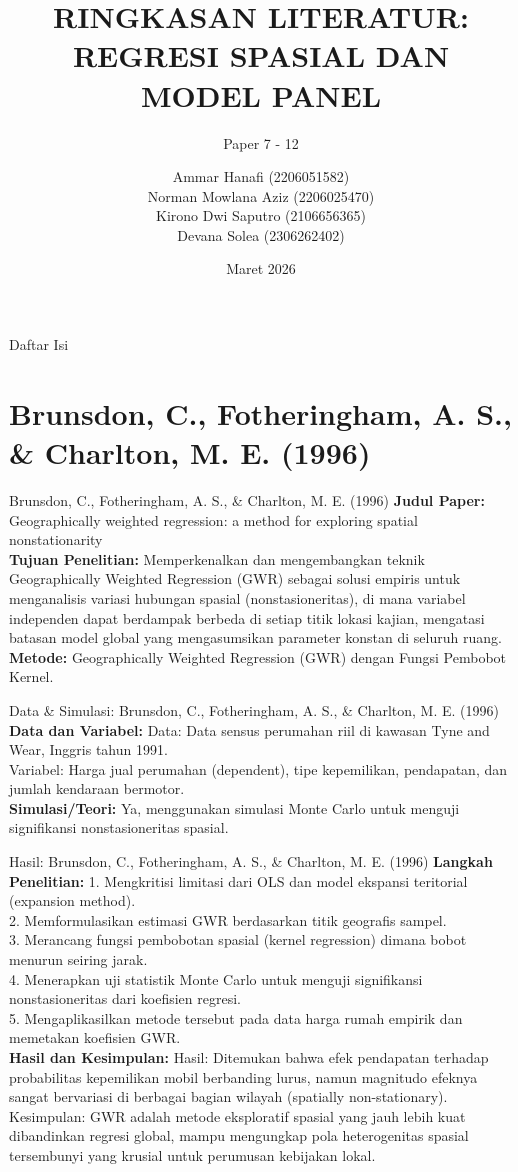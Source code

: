 \documentclass{beamer}
\title[Ringkasan Literatur Spasial 7-12]{RINGKASAN LITERATUR: REGRESI SPASIAL DAN MODEL PANEL}
\subtitle{Paper 7 - 12}
\author[Ammar, Norman, Kirono, Devana]{
    Ammar Hanafi (2206051582) \\ 
    Norman Mowlana Aziz (2206025470) \\ 
    Kirono Dwi Saputro (2106656365) \\ 
    Devana Solea (2306262402)
}
\institute[Univ. Indonesia]{
    Program Studi Sarjana Statistika \\
    Fakultas Matematika dan Ilmu Pengetahuan Alam \\
    Universitas Indonesia
}
\date{Maret 2026}
\begin{document}
\frame{\titlepage}

\begin{frame}[allowframebreaks]{Daftar Isi}
    \tableofcontents
\end{frame}
\section{Brunsdon, C., Fotheringham, A. S., \& Charlton, M. E. (1996)}
\begin{frame}[allowframebreaks]{Brunsdon, C., Fotheringham, A. S., \& Charlton, M. E. (1996)}
\textbf{Judul Paper:} Geographically weighted regression: a method for exploring spatial nonstationarity \\[0.3cm]
\textbf{Tujuan Penelitian:} Memperkenalkan dan mengembangkan teknik Geographically Weighted Regression (GWR) sebagai solusi empiris untuk menganalisis variasi hubungan spasial (nonstasioneritas), di mana variabel independen dapat berdampak berbeda di setiap titik lokasi kajian, mengatasi batasan model global yang mengasumsikan parameter konstan di seluruh ruang. \\[0.3cm]
\textbf{Metode:} Geographically Weighted Regression (GWR) dengan Fungsi Pembobot Kernel.
\end{frame}

\begin{frame}[allowframebreaks]{Data \& Simulasi: Brunsdon, C., Fotheringham, A. S., \& Charlton, M. E. (1996)}
\textbf{Data dan Variabel:} Data: Data sensus perumahan riil di kawasan Tyne and Wear, Inggris tahun 1991.\\ Variabel: Harga jual perumahan (dependent), tipe kepemilikan, pendapatan, dan jumlah kendaraan bermotor. \\[0.3cm]
\textbf{Simulasi/Teori:} Ya, menggunakan simulasi Monte Carlo untuk menguji signifikansi nonstasioneritas spasial.
\end{frame}

\begin{frame}[allowframebreaks]{Hasil: Brunsdon, C., Fotheringham, A. S., \& Charlton, M. E. (1996)}
\textbf{Langkah Penelitian:} 1. Mengkritisi limitasi dari OLS dan model ekspansi teritorial (expansion method).\\ 2. Memformulasikan estimasi GWR berdasarkan titik geografis sampel.\\ 3. Merancang fungsi pembobotan spasial (kernel regression) dimana bobot menurun seiring jarak.\\ 4. Menerapkan uji statistik Monte Carlo untuk menguji signifikansi nonstasioneritas dari koefisien regresi.\\ 5. Mengaplikasilkan metode tersebut pada data harga rumah empirik dan memetakan koefisien GWR. \\[0.3cm]
\textbf{Hasil dan Kesimpulan:} Hasil: Ditemukan bahwa efek pendapatan terhadap probabilitas kepemilikan mobil berbanding lurus, namun magnitudo efeknya sangat bervariasi di berbagai bagian wilayah (spatially non-stationary).\\ Kesimpulan: GWR adalah metode eksploratif spasial yang jauh lebih kuat dibandinkan regresi global, mampu mengungkap pola heterogenitas spasial tersembunyi yang krusial untuk perumusan kebijakan lokal.
\end{frame}
\end{document}
